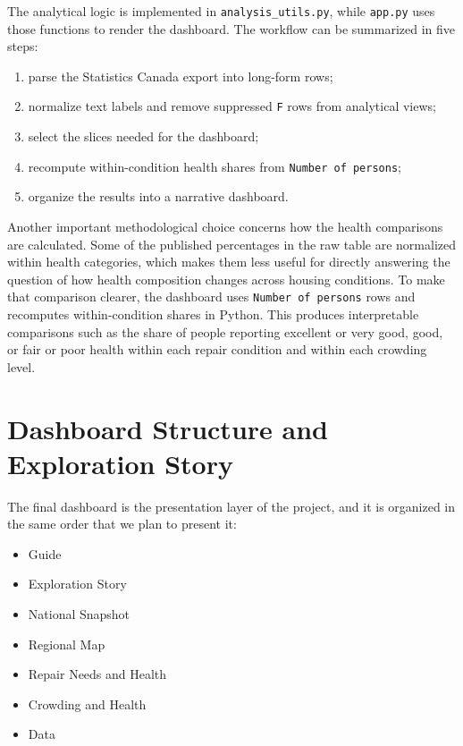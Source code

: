\documentclass[conference]{IEEEtran}
\begin{document}
The analytical logic is implemented in \texttt{analysis\_utils.py}, while \texttt{app.py} uses those functions to render the dashboard. The workflow can be summarized in five steps:

\begin{enumerate}
    \item parse the Statistics Canada export into long-form rows;
    \item normalize text labels and remove suppressed \texttt{F} rows from analytical views;
    \item select the slices needed for the dashboard;
    \item recompute within-condition health shares from \texttt{Number of persons};
    \item organize the results into a narrative dashboard.
\end{enumerate}

Another important methodological choice concerns how the health comparisons are calculated. Some of the published percentages in the raw table are normalized within health categories, which makes them less useful for directly answering the question of how health composition changes across housing conditions. To make that comparison clearer, the dashboard uses \texttt{Number of persons} rows and recomputes within-condition shares in Python. This produces interpretable comparisons such as the share of people reporting excellent or very good, good, or fair or poor health within each repair condition and within each crowding level.

\section{Dashboard Structure and Exploration Story}

The final dashboard is the presentation layer of the project, and it is organized in the same order that we plan to present it:

\begin{itemize}
    \item Guide
    \item Exploration Story
    \item National Snapshot
    \item Regional Map
    \item Repair Needs and Health
    \item Crowding and Health
    \item Data
\end{itemize}
\end{document}
